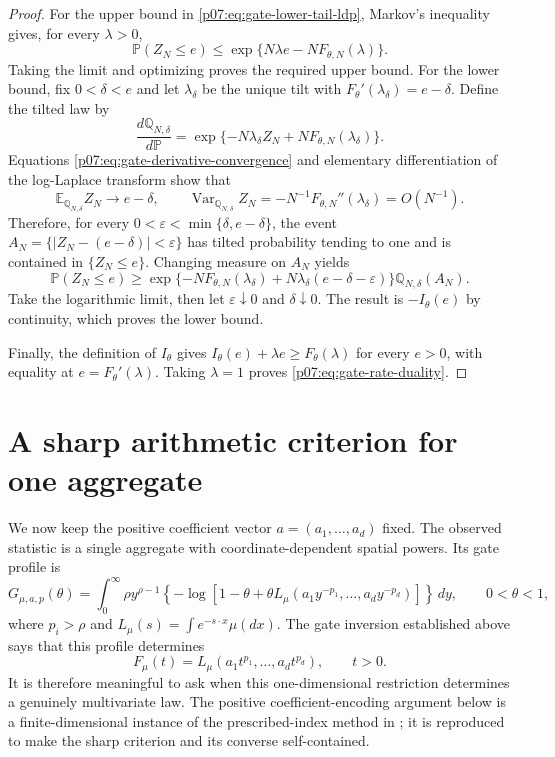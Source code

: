 \documentclass[11pt,letterpaper]{article}
\theoremstyle{definition}
\theoremstyle{remark}
\newcommand{\E}{\mathbb E}
\newcommand{\Pp}{\mathbb P}
\newcommand{\1}{\mathbf 1}
\begin{document}
\begin{proof}
For the upper bound in \eqref{p07:eq:gate-lower-tail-ldp}, Markov's
inequality gives, for every $\lambda>0$,
\[
 \Pp(Z_N\leq e)\leq
 \exp\{N\lambda e-NF_{\theta,N}(\lambda)\}.
\]
Taking the limit and optimizing proves the required upper bound.
For the lower bound, fix $0<\delta<e$ and let $\lambda_\delta$ be
the unique tilt with $F_\theta'(\lambda_\delta)=e-\delta$.
Define the tilted law by
\[
 \frac{d\mathbb Q_{N,\delta}}{d\mathbb P}
 =\exp\{-N\lambda_\delta Z_N+NF_{\theta,N}(\lambda_\delta)\}.
\]
Equations \eqref{p07:eq:gate-derivative-convergence} and elementary
differentiation of the log-Laplace transform show that
\[
 \E_{\mathbb Q_{N,\delta}}Z_N\longrightarrow e-\delta,
 \qquad
 \operatorname{Var}_{\mathbb Q_{N,\delta}}Z_N
       =-N^{-1}F_{\theta,N}''(\lambda_\delta)=O(N^{-1}).
\]
Therefore, for every $0<\varepsilon<\min\{\delta,e-\delta\}$,
the event $A_N=\{|Z_N-(e-\delta)|<\varepsilon\}$ has tilted
probability tending to one and is contained in $\{Z_N\leq e\}$.
Changing measure on $A_N$ yields
\[
 \Pp(Z_N\leq e)\geq
 \exp\{-NF_{\theta,N}(\lambda_\delta)
       +N\lambda_\delta(e-\delta-\varepsilon)\}
 \mathbb Q_{N,\delta}(A_N).
\]
Take the logarithmic limit, then let $\varepsilon\downarrow0$ and
$\delta\downarrow0$. The result is $-I_\theta(e)$ by continuity,
which proves the lower bound.

Finally, the definition of $I_\theta$ gives
$I_\theta(e)+\lambda e\geq F_\theta(\lambda)$ for every $e>0$,
with equality at $e=F_\theta'(\lambda)$. Taking $\lambda=1$ proves
\eqref{p07:eq:gate-rate-duality}.
\end{proof}

\section{A sharp arithmetic criterion for one aggregate}
\label{p07:sec:gate-resonance}

We now keep the positive coefficient vector $a=(a_1,\ldots,a_d)$ fixed.
The observed statistic is a single aggregate with coordinate-dependent
spatial powers.  Its gate profile is
\begin{equation}\label{p07:eq:res-gate}
 G_{\mu,a,p}(\theta)=\int_0^\infty \rho y^{\rho-1}
 \left\{-\log\left[1-\theta+
 \theta L_\mu(a_1y^{-p_1},\ldots,a_dy^{-p_d})\right]\right\}\,dy,
 \qquad 0<\theta<1,
\end{equation}
where $p_i>\rho$ and $L_\mu(s)=\int e^{-s\cdot x}\mu(dx)$.
The gate inversion established above says that this profile determines
\begin{equation}\label{p07:eq:res-curve}
 F_\mu(t)=L_\mu(a_1t^{p_1},\ldots,a_dt^{p_d}),\qquad t>0.
\end{equation}
It is therefore meaningful to ask when this one-dimensional restriction
determines a genuinely multivariate law. The positive coefficient-encoding
argument below is a finite-dimensional instance of the prescribed-index
method in \cite[Lemmas~3.2--3.3]{Lenzi2026}; it is reproduced to make
the sharp criterion and its converse self-contained.
\end{document}
